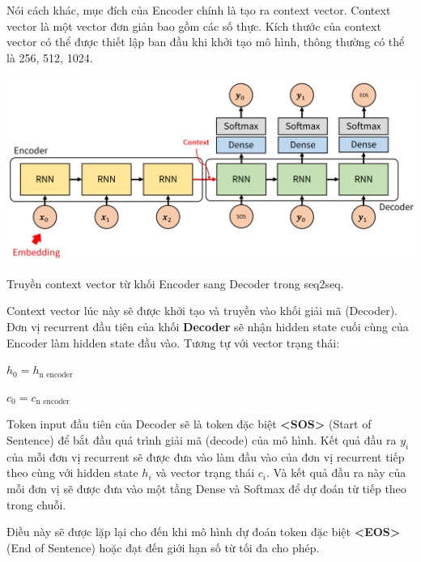\documentclass[a4paper, 12pt, openany]{book}
\begin{document}
Nói cách khác, mục đích của Encoder chính là tạo ra context vector. Context vector
là một vector đơn giản bao gồm các số thực. Kích thước của context vector có thể được
thiết lập ban đầu khi khởi tạo mô hình, thông thường có thể là 256, 512, 1024.

\begin{minipage}{\linewidth}
    \captionsetup{type=figure}
    \centering
    \includegraphics[width=\linewidth]{./assets/images/seq2seq_detail.png}
    \caption{Truyền context vector từ khối Encoder sang Decoder trong \ac{seq2seq}.\cite{sutskever2014sequence}}
\end{minipage}
\vspace{0.5cm}

Context vector lúc này sẽ được khởi tạo và truyền vào khối giải mã (Decoder).
Đơn vị recurrent đầu tiên của khối \textbf{Decoder} sẽ nhận hidden state cuối cùng của Encoder làm hidden state đầu vào.
Tương tự với vector trạng thái:

\begin{center}

    \(h_0 = h_{\text{n encoder}}\)

    \(c_0 = c_{\text{n encoder}}\)
\end{center}

Token input đầu tiên của Decoder sẽ là token đặc biệt \textbf{<SOS>} (Start of Sentence) để bắt đầu quá trình giải mã (decode) của mô hình.
Kết quả đầu ra \(y_i\) của mỗi đơn vị recurrent sẽ được đưa vào làm đầu vào của đơn vị recurrent tiếp theo cùng với hidden state \(h_i\) và vector trạng thái \(c_i\).
Và kết quả đầu ra này của mỗi đơn vị sẽ được đưa vào một tầng Dense và Softmax để dự đoán từ tiếp theo trong chuỗi.

Điều này sẽ được lặp lại cho đến khi mô hình dự đoán token đặc biệt \textbf{<EOS>} (End of Sentence) hoặc đạt đến giới hạn số từ tối đa cho phép.
\end{document}
